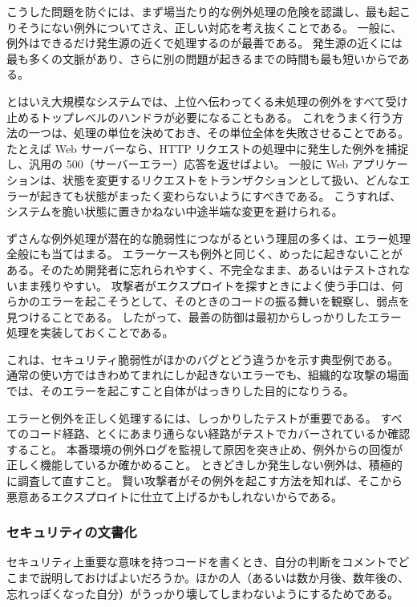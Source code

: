 \documentclass[uplatex]{jsarticle}
\def\label#1{}%
\begin{document}
こうした問題を防ぐには、まず場当たり的な例外処理の危険を認識し、最も起こりそうにない例外についてさえ、正しい対応を考え抜くことである。
一般に、例外はできるだけ発生源の近くで処理するのが最善である。
発生源の近くには最も多くの文脈があり、さらに別の問題が起きるまでの時間も最も短いからである。

とはいえ大規模なシステムでは、上位へ伝わってくる未処理の例外をすべて受け止めるトップレベルのハンドラが必要になることもある。
これをうまく行う方法の一つは、処理の単位を決めておき、その単位全体を失敗させることである。
たとえば Web サーバーなら、HTTP リクエストの処理中に発生した例外を捕捉し、汎用の 500（サーバーエラー）応答を返せばよい。
一般に Web アプリケーションは、状態を変更するリクエストをトランザクションとして扱い、どんなエラーが起きても状態がまったく変わらないようにすべきである。
こうすれば、システムを脆い状態に置きかねない中途半端な変更を避けられる。

ずさんな例外処理が潜在的な脆弱性につながるという理屈の多くは、エラー処理全般にも当てはまる。
エラーケースも例外と同じく、めったに起きないことがある。そのため開発者に忘れられやすく、不完全なまま、あるいはテストされないまま残りやすい。
攻撃者がエクスプロイトを探すときによく使う手口は、何らかのエラーを起こそうとして、そのときのコードの振る舞いを観察し、弱点を見つけることである。
したがって、最善の防御は最初からしっかりしたエラー処理を実装しておくことである。

\begin{rem}[エラーが攻撃の目的になる]\label{rem:ch13-error-as-goal}
これは、セキュリティ脆弱性がほかのバグとどう違うかを示す典型例である。
通常の使い方ではきわめてまれにしか起きないエラーでも、組織的な攻撃の場面では、そのエラーを起こすこと自体がはっきりした目的になりうる。
\end{rem}

エラーと例外を正しく処理するには、しっかりしたテストが重要である。
すべてのコード経路、とくにあまり通らない経路がテストでカバーされているか確認すること。
本番環境の例外ログを監視して原因を突き止め、例外からの回復が正しく機能しているか確かめること。
ときどきしか発生しない例外は、積極的に調査して直すこと。
賢い攻撃者がその例外を起こす方法を知れば、そこから悪意あるエクスプロイトに仕立て上げるかもしれないからである。

\subsubsection{セキュリティの文書化}

セキュリティ上重要な意味を持つコードを書くとき、自分の判断をコメントでどこまで説明しておけばよいだろうか。ほかの人（あるいは数か月後、数年後の、忘れっぽくなった自分）がうっかり壊してしまわないようにするためである。
\end{document}
